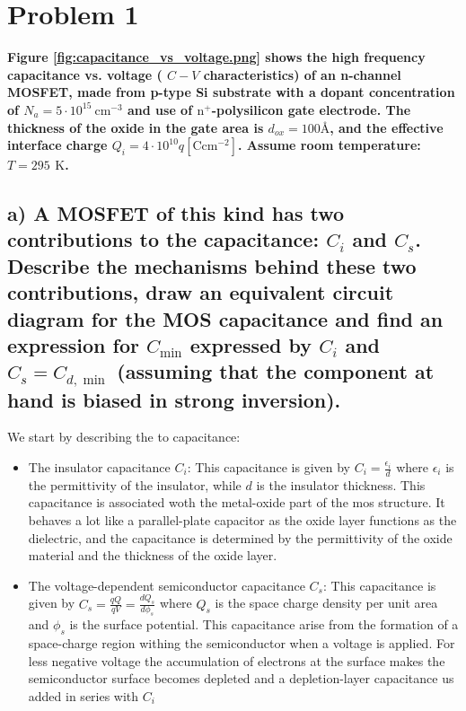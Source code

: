 \section{Problem 1}

\textbf{Figure \ref{fig:capacitance_vs_voltage.png} shows the high frequency capacitance vs. voltage ( $C-V$ characteristics) of an n-channel MOSFET, made from p-type Si substrate with a dopant concentration of $N_a=5 \cdot 10^{15} \mathrm{~cm}^{-3}$ and use of $\mathrm{n}^{+}$-polysilicon gate electrode. The thickness of the oxide in the gate area is $d_{o x}=100\text{Å}$, and the effective interface charge $Q_i=4 \cdot 10^{10} q\left[\mathrm{C} \mathrm{cm}^{-2}\right]$. Assume room temperature: $T=295$ $\mathrm{K}$.}


\subsection*{a) A MOSFET of this kind has two contributions to the capacitance: $C_i$ and $C_s$. Describe the mechanisms behind these two contributions, draw an equivalent circuit diagram for the MOS capacitance and find an expression for $C_{\min }$ expressed by $C_i$ and $C_s=C_{d, \min }$ (assuming that the component at hand is biased in strong inversion).}

We start by describing the to capacitance:
\begin{itemize}
    \item The insulator capacitance $C_i$:
    \subitem This capacitance is given by $C_i=\frac{\epsilon_i}{d}$ where $\epsilon_i$ is the permittivity of the insulator, while $d$ is the insulator thickness. This capacitance is associated woth the metal-oxide part of the mos structure. It behaves a lot like a parallel-plate capacitor as the oxide layer functions as the dielectric, and the capacitance is determined by the permittivity of the oxide material and the thickness of the oxide layer.
    \item The voltage-dependent semiconductor capacitance $C_s$:
    \subitem This capacitance is given by $C_s=\frac{qQ}{qV}=\frac{dQ_s}{d\phi_s}$ where $Q_s$ is the space charge density per unit area and $\phi_s$ is the surface potential. This capacitance arise from the formation of a space-charge region withing the semiconductor when a voltage is applied. For less negative voltage the accumulation of electrons at the surface makes the semiconductor surface becomes depleted and a depletion-layer capacitance us added in series with $C_i$
\end{itemize}

